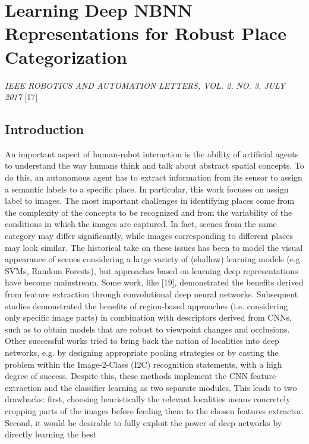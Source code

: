\section{Learning Deep NBNN Representations for Robust Place
Categorization}\label{header-n666}

\emph{IEEE ROBOTICS AND AUTOMATION LETTERS, VOL. 2, NO. 3, JULY 2017}
{[}17{]}

\subsection{Introduction}\label{header-n668}

An important aspect of human-robot interaction is the ability of
artificial agents to understand the way humans think and talk about
abstract spatial concepts. To do this, an autonomous agent has to
extract information from its sensor to assign a semantic labels to a
specific place. In particular, this work focuses on assign label to
images. The most important challenges in identifying places come from
the complexity of the concepts to be recognized and from the variability
of the conditions in which the images are captured. In fact, scenes from
the same category may differ significantly, while images corresponding
to different places may look similar. The historical take on these
issues has been to model the visual appearance of scenes considering a
large variety of (shallow) learning models (e.g. SVMs, Random Forests),
but approaches based on learning deep representations have become
mainstream. Some work, like {[}19{]}, demonstrated the benefits derived
from feature extraction through convolutional deep neural networks.
Subsequent studies demonstrated the benefits of region-based approaches
(i.e. considering only specific image parts) in combination with
descriptors derived from CNNs, such as to obtain models that are robust
to viewpoint changes and occlusions. Other successful works tried to
bring back the notion of localities into deep networks, e.g. by
designing appropriate pooling strategies or by casting the problem
within the Image-2-Class (I2C) recognition statements, with a high
degree of success. Despite this, these methods implement the CNN feature
extraction and the classifier learning as two separate modules. This
leads to two drawbacks: first, choosing heuristically the relevant
localities means concretely cropping parts of the images before feeding
them to the chosen features extractor. Second, it would be desirable to
fully exploit the power of deep networks by directly learning the best
